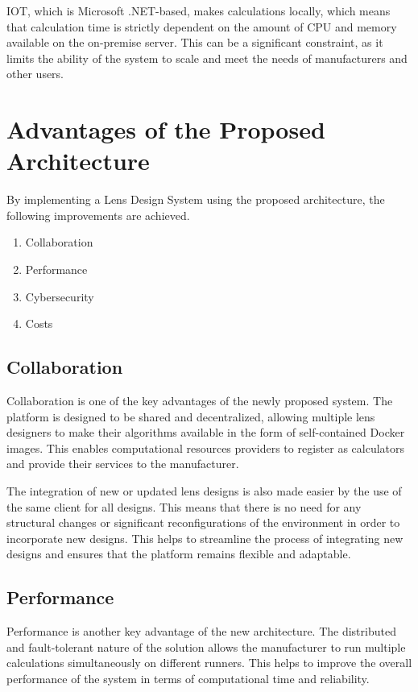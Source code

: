 \documentclass[10pt,a4paper]{report}
\begin{document}
\large\justify IOT, which is Microsoft .NET-based, makes calculations locally, which means that calculation time is strictly dependent on the amount of CPU and memory available on the on-premise server. This can be a significant constraint, as it limits the ability of the system to scale and meet the needs of manufacturers and other users.

\section{Advantages of the Proposed Architecture}
\large\justify By implementing a Lens Design System using the proposed architecture, the following improvements are achieved.

\begin{enumerate}
    \item Collaboration
    \item Performance
    \item Cybersecurity
    \item Costs
\end{enumerate}

\subsection{Collaboration}
\large\justify Collaboration is one of the key advantages of the newly proposed system. The platform is designed to be shared and decentralized, allowing multiple lens designers to make their algorithms available in the form of self-contained Docker images. This enables computational resources providers to register as calculators and provide their services to the manufacturer.

\large\justify The integration of new or updated lens designs is also made easier by the use of the same client for all designs. This means that there is no need for any structural changes or significant reconfigurations of the environment in order to incorporate new designs. This helps to streamline the process of integrating new designs and ensures that the platform remains flexible and adaptable.

\subsection{Performance}
\large\justify Performance is another key advantage of the new architecture. The distributed and fault-tolerant nature of the solution allows the manufacturer to run multiple calculations simultaneously on different runners. This helps to improve the overall performance of the system in terms of computational time and reliability.
\end{document}
